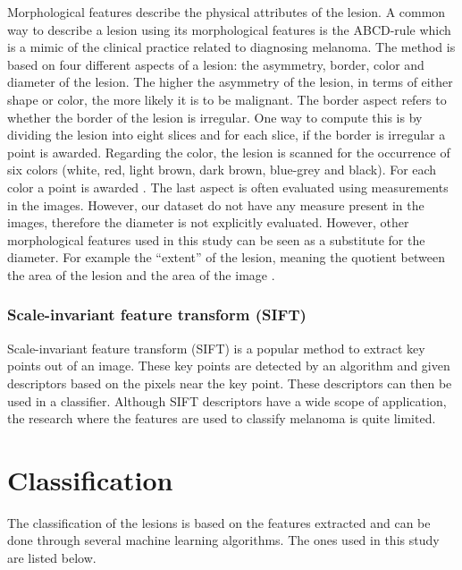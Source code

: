 \documentclass{kththesis}
\begin{document}
Morphological features describe the physical attributes of the lesion.
A common way to describe a lesion using its morphological features is the ABCD-rule which is a mimic of the clinical practice related to diagnosing melanoma. The method is based on four different aspects of a lesion: the asymmetry, border, color and diameter of the lesion.
The higher the asymmetry of the lesion, in terms of either shape or color, the more likely it is to be malignant. The border aspect refers to whether the border of the lesion is irregular. One way to compute this is by dividing the lesion into eight slices and for each slice, if the border is irregular a point is awarded.
Regarding the color, the lesion is scanned for the occurrence of six colors (white, red, light brown, dark brown, blue-grey and black). For each color a point is awarded \parencite{https://doi.org/10.1049/iet-ipr.2015.0385}.
The last aspect is often evaluated using measurements in the images. However, our dataset do not have any measure present in the images, therefore the diameter is not explicitly evaluated. However, other morphological features used in this study can be seen as a substitute for the diameter. For example the ``extent''  of the lesion, meaning the quotient between the area of the lesion and the area of the image \parencite{sanchez-reyes2020highaccuracy}.
\parencite{smaoui2013developed}

\subsubsection{Scale-invariant feature transform (SIFT)}

Scale-invariant feature transform (SIFT) is a popular method to extract key points out of an image. These key points are detected by an algorithm and given descriptors based on the pixels near the key point. These descriptors can then be used in a classifier. \parencite{lowe2004distinctive}
Although SIFT descriptors have a wide scope of application, the research where the features are used to classify melanoma is quite limited.

\section{Classification}

The classification of the lesions is based on the features extracted and can be done through several machine learning algorithms. The ones used in this study are listed below.


\end{document}
